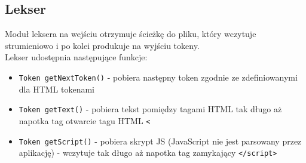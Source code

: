 \documentclass[11pt]{article}
\def\code#1{\texttt{#1}}
\begin{document}
\subsection{Lekser}
Moduł leksera na wejściu otrzymuje ścieżkę do pliku, który wczytuje strumieniowo i po kolei produkuje na wyjściu tokeny.\\
Lekser udostępnia następujące funkcje:
\begin{itemize}
\item \code{Token getNextToken()} - pobiera następny token zgodnie ze zdefiniowanymi dla HTML tokenami
\item \code{Token getText()} - pobiera tekst pomiędzy tagami HTML tak długo aż napotka tag otwarcie tagu HTML \code{<}
\item \code{Token getScript()} - pobiera skrypt JS (JavaScript nie jest parsowany przez aplikację) - wczytuje tak długo aż napotka tag zamykający \code{</script>}
\end{itemize}
\end{document}
